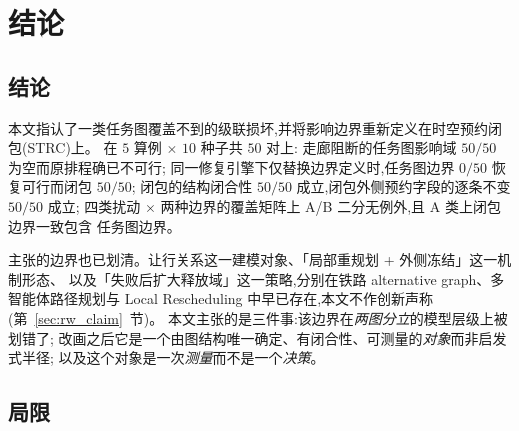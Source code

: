 \documentclass[manuscript,screen,review]{acmart}
\providecommand{\STRC}{\textsc{STRC}}
\newcommand{\NInst}{5}
\newcommand{\NSeeds}{10}
\newcommand{\NPairs}{50}
\newcommand{\PassMiss}{\NPairs/\NPairs}      %
\newcommand{\FeasRone}{0/\NPairs}            %
\newcommand{\FeasRtwo}{\NPairs/\NPairs}      %
\newcommand{\PassClosed}{\NPairs/\NPairs}    %
\newcommand{\PassInvar}{\NPairs/\NPairs}     %
\begin{document}
\section{结论}
\label{sec:conclusion}

\subsection{结论}

本文指认了一类任务图覆盖不到的级联损坏,并将影响边界重新定义在时空预约闭包(\STRC)上。
在 \(\NInst\) 算例 \(\times\) \(\NSeeds\) 种子共 \(\NPairs\) 对上:
走廊阻断的任务图影响域 \(\PassMiss\) 为空而原排程确已不可行;
同一修复引擎下仅替换边界定义时,任务图边界 \(\FeasRone\) 恢复可行而闭包 \(\FeasRtwo\);
闭包的结构闭合性 \(\PassClosed\) 成立,闭包外侧预约字段的逐条不变 \(\PassInvar\) 成立;
四类扰动 \(\times\) 两种边界的覆盖矩阵上 A/B 二分无例外,且 A 类上闭包边界一致包含
任务图边界。

主张的边界也已划清。让行关系这一建模对象、「局部重规划 + 外侧冻结」这一机制形态、
以及「失败后扩大释放域」这一策略,分别在铁路 alternative graph、多智能体路径规划与
Local Rescheduling 中早已存在,本文不作创新声称(第~\ref{sec:rw_claim}~节)。
本文主张的是三件事:该边界在\emph{两图分立}的模型层级上被划错了;
改画之后它是一个由图结构唯一确定、有闭合性、可测量的\emph{对象}而非启发式半径;
以及这个对象是一次\emph{测量}而不是一个\emph{决策}。

\subsection{局限}
\label{sec:limitations}
\end{document}
